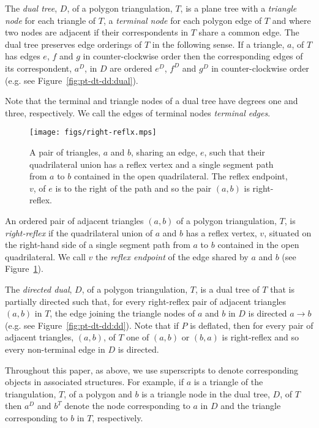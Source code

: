 \documentclass{amsart}
\begin{document}
The \emph{dual tree}, $D$, of a polygon triangulation, $T$, is a plane
tree with a \emph{triangle node} for each triangle of $T$, a
\emph{terminal node} for each polygon edge of $T$ and where two nodes
are adjacent if their correspondents in $T$ share a common edge.  The
dual tree preserves edge orderings of $T$ in the following sense.  If
a triangle, $a$, of $T$ has edges $e$, $f$ and $g$ in
counter-clockwise order then the corresponding edges of its
correspondent, $a^D$, in $D$ are ordered $e^D$, $f^D$ and $g^D$ in
counter-clockwise order (e.g. see Figure~\ref{fig:pt-dt-dd:dual}).

Note that the terminal and triangle nodes of a dual tree have degrees
one and three, respectively.  We call the edges of terminal nodes
\emph{terminal edges}.


\begin{figure}[htb]
  \centering
  \texttt{[image: figs/right-reflx.mps]}
  \caption{A pair of triangles, $a$ and $b$, sharing an edge, $e$,
    such that their quadrilateral union has a reflex vertex and a
    single segment path from $a$ to $b$ contained in the open
    quadrilateral.  The reflex endpoint, $v$, of $e$ is to the right
    of the path and so the pair $(a,b)$ is right-reflex.}
  \label{fig:rrefl}
\end{figure}

An ordered pair of adjacent triangles $(a,b)$ of a polygon
triangulation, $T$, is \emph{right-reflex} if the quadrilateral union
of $a$ and $b$ has a reflex vertex, $v$, situated on the right-hand
side of a single segment path from $a$ to $b$ contained in the open
quadrilateral.  We call $v$ the \emph{reflex endpoint} of the edge
shared by $a$ and $b$ (see Figure~\ref{fig:rrefl}).

The \emph{directed dual}, $D$, of a polygon triangulation, $T$, is a
dual tree of $T$ that is partially directed such that, for every
right-reflex pair of adjacent triangles $(a, b)$ in $T$, the edge
joining the triangle nodes of $a$ and $b$ in $D$ is directed
$a\rightarrow b$ (e.g. see Figure~\ref{fig:pt-dt-dd:dd}).  Note that
if $P$ is deflated, then for every pair of adjacent triangles, $(a,
b)$, of $T$ one of $(a, b)$ or $(b, a)$ is right-reflex and so every
non-terminal edge in $D$ is directed.

Throughout this paper, as above, we use superscripts to denote
corresponding objects in associated structures.  For example, if $a$
is a triangle of the triangulation, $T$, of a polygon and $b$ is a
triangle node in the dual tree, $D$, of $T$ then $a^D$ and $b^T$
denote the node corresponding to $a$ in $D$ and the triangle
corresponding to $b$ in $T$, respectively.
\end{document}
